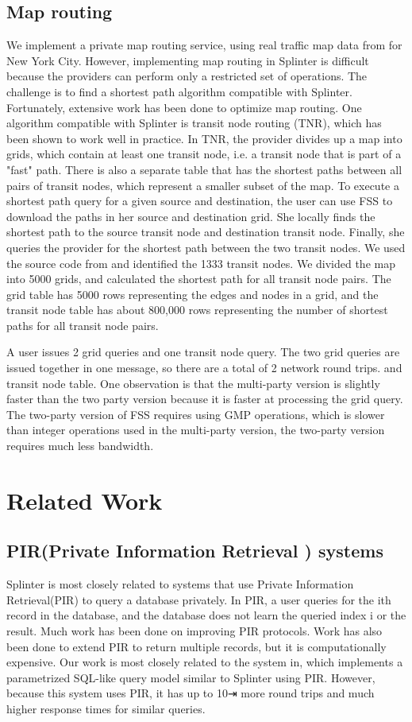 \documentclass[12pt,a4paper]{article}
\begin{document}
\begin{multicols}{2}
\subsection{Map routing}
We implement a private map routing service, using real traffic map data from for New York City. However, implementing map routing in Splinter is difficult because the providers can perform only a restricted set of operations. The challenge is to find a shortest path algorithm compatible with Splinter. Fortunately, extensive work has been done to optimize map routing. One algorithm compatible with Splinter is transit node routing (TNR), which has been shown to work well in practice. In TNR, the provider divides up a map into grids, which contain at least one transit node, i.e. a transit node that is part of a "fast" path. There is also a separate table that has the shortest paths between all pairs of transit nodes, which represent a smaller subset of the map. To execute a shortest path query for a given source and destination, the user can use FSS to download the paths in her source and destination grid. She locally finds the shortest path to the source transit node and destination transit node. Finally, she queries the provider for the shortest path between the two transit nodes.
We used the source code from and identified the 1333 transit nodes. We divided the map into 5000 grids, and calculated the shortest path for all transit node pairs. The grid table has 5000 rows representing the edges and nodes in a grid, and the transit node table has about 800,000 rows representing the number of shortest paths for all transit node pairs.

A user issues 2 grid queries and one transit node query. The two grid queries are issued together in one message, so there are a total of 2 network round trips.
and transit node table. One observation is that the multi-party version is slightly faster than the two party version because it is faster at processing the grid query. The two-party version of FSS requires using GMP operations, which is slower than integer operations used in the multi-party version, the two-party version requires much less bandwidth.


\section{Related Work}
\subsection{PIR(Private Information Retrieval ) 
systems}
Splinter is most closely related to systems that 
use Private Information Retrieval(PIR) to query a 
database privately. In PIR, a user queries for the 
ith record in the database, and the database does 
not learn the queried index i or the result. Much 
work has been done on improving PIR protocols. Work 
has also been done to extend PIR to return multiple 
records, but it is computationally expensive. Our 
work is most closely related to the system in, 
which implements a parametrized SQL-like query 
model similar to Splinter using PIR. However, 
because this system uses PIR, it has up to 10⇥ more 
round trips and much higher response times for 
similar queries.


\end{multicols}
\end{document}
